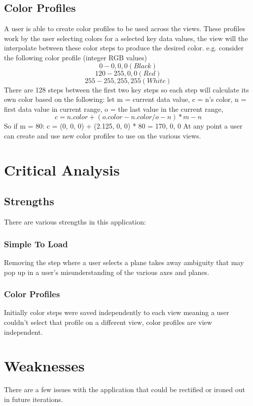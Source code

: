 \documentclass[pdftex,a4paper,10pt,titlepage]{article}
\begin{document}
\subsection{Color Profiles}
A user is able to create color profiles to be used across the views. These profiles work by the user selecting colors for a selected key data values, the view will the interpolate between these color steps to produce the desired color. e.g. consider the following color profile (integer RGB values)
\begin{equation*}
0 - 0,0,0 (Black)
\end{equation*}
\begin{equation*}
120 - 255, 0 , 0 (Red)
\end{equation*}
\begin{equation*}
255 - 255, 255, 255 (White)
\end{equation*}
There are 128 steps between the first two key steps so each step will calculate its own color based on the following:
let m = current data value, c = n’s color, n = first data value in current range, o = the last value in the current range,
\begin{equation*}
c = n.color + (o.color - n.color / o - n) * m - n
\end{equation*}
So if m = 80: c = (0, 0, 0) + (2.125, 0, 0) * 80 = 170, 0, 0
At any point a user can create and use new color profiles to use on the various views.
\pagebreak
\section{Critical Analysis}
\subsection{Strengths}
There are various strengths in this application:
\subsubsection{Simple To Load}
Removing the step where a user selects a plane takes away ambiguity that may pop up in a user’s misunderstanding of the various axes and planes.
\subsubsection{Color Profiles}
Initially color steps were saved independently to each view meaning a user couldn’t select that profile on a different view, color profiles are view independent.
\section{Weaknesses}
There are a few issues with the application that could be rectified or ironed out in future iterations. 
\end{document}
